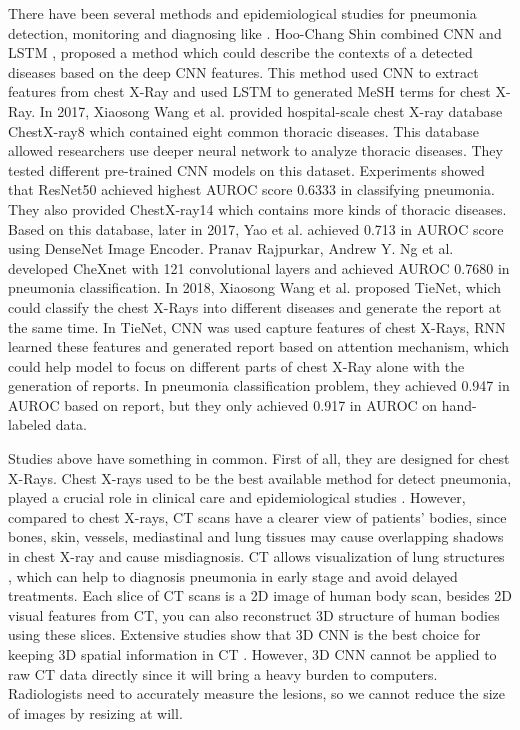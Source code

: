 \documentclass[journal]{IEEEtran}
\begin{document}
There have been several methods and epidemiological studies for pneumonia detection, monitoring and diagnosing like \cite{Shin2016Learning, deepika2018classification, iakovidis2012image}.
Hoo-Chang Shin \cite{Shin2016Learning} combined CNN and LSTM \cite{hochreiter1997long}, proposed a method which could describe the contexts of a detected diseases based on the deep CNN features. This method used CNN to extract features from chest X-Ray and used LSTM to generated MeSH \cite{timmurphy.org} terms for chest X-Ray. In 2017, Xiaosong Wang et al. \cite{Wang2017ChestX} provided hospital-scale chest X-ray database ChestX-ray8 which contained eight common thoracic diseases. This database allowed researchers use deeper neural network to analyze thoracic diseases. They tested different pre-trained CNN models on this dataset. Experiments showed that ResNet50 achieved highest AUROC score 0.6333 in classifying pneumonia. They also provided ChestX-ray14 which contains more kinds of thoracic diseases.
Based on this database, later in 2017, Yao et al. \cite{yao2017learning} achieved 0.713 in AUROC score using DenseNet Image Encoder. Pranav Rajpurkar, Andrew Y. Ng et al. \cite{Rajpurkar2017CheXNet} developed CheXnet with 121 convolutional layers and achieved AUROC 0.7680 in pneumonia classification.
In 2018, Xiaosong Wang et al. \cite{Wang2018TieNet} proposed TieNet, which could classify the chest X-Rays into different diseases and generate the report at the same time. In TieNet, CNN was used capture features of chest X-Rays, RNN learned these features and generated report based on attention mechanism, which could help model to focus on different parts of chest X-Ray alone with the generation of reports. In pneumonia classification problem, they achieved 0.947 in AUROC based on report, but they only achieved 0.917 in AUROC on hand-labeled data. 

Studies above have something in common. First of all, they are designed for chest X-Rays. Chest X-rays used to be the best available method for detect pneumonia, played a crucial role in clinical care and epidemiological studies \cite{Franquet2001Imaging, Thomas2005Standardized}. However, compared to chest X-rays, CT scans have a clearer view of patients' bodies, since bones, skin, vessels, mediastinal and lung tissues may cause overlapping shadows in chest X-ray and cause misdiagnosis. CT allows visualization of lung structures \cite{korfiatis2009texture}, which can help to diagnosis pneumonia in early stage and avoid delayed treatments.
Each slice of CT scans is a 2D image of human body scan, besides 2D visual features from CT, you can also reconstruct 3D structure of human bodies using these slices. Extensive studies show that 3D CNN is the best choice for keeping 3D spatial information in CT \cite{Yorozu1987Electron}. However, 3D CNN cannot be applied to raw CT data directly since it will bring a heavy burden to computers. Radiologists need to accurately measure the lesions, so we cannot reduce the size of images by resizing at will.
 
\end{document}
